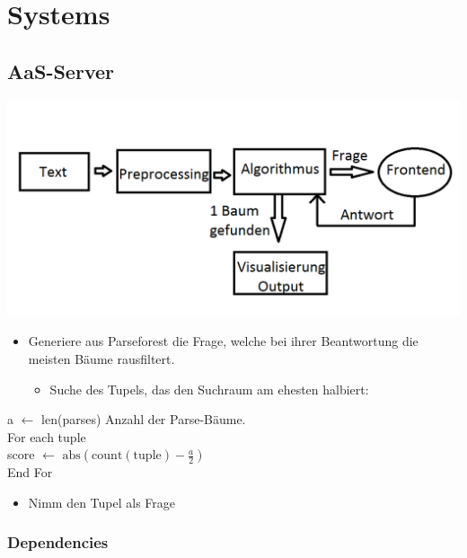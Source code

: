 \documentclass{scrartcl}
\begin{document}
\section{Systems}
\label{sec:Systems}

\subsection{AaS-Server}
\label{sub:AaS-Server}

    \includegraphics[scale=0.4]{Grafik}
    \begin{itemize}
        \item Generiere aus Parseforest die Frage, welche bei ihrer Beantwortung die meisten Bäume rausfiltert.
            \begin{itemize}
                    \vspace{5pt}
                \item Suche des Tupels, das den Suchraum am ehesten halbiert:
            \end{itemize}
    \end{itemize}
    \vspace{5pt}

        a $\gets$ len(parses) Anzahl der Parse-Bäume. \\
        For each tuple \\
        score $\gets$ $\mathrm{abs}(\mathrm{count(tuple)} - \frac{a}{2})$ \\
        End For

    \vspace{5pt}
    \begin{itemize}
        \item Nimm den Tupel als Frage
    \end{itemize}


\subsubsection{Dependencies}
\label{ssub:Server-Dependencies}
\end{document}
